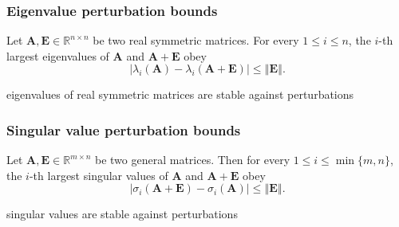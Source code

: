 \documentclass[compress,
mathserif,wide,%
]{beamer}
\begin{document}
\begin{frame}
	\frametitle{Eigenvalue perturbation bounds}
	\begin{lemma}
\label{lemma:weyl}
Let $\bm{A},\bm{E}\in\mathbb{R}^{n\times n}$ be two real symmetric matrices.
	For every $1\leq i\leq n$, the $i$-th largest eigenvalues of $\bm{A}$ and $\bm{A}+\bm{E}$ obey
%
\begin{equation*}
	\left|\lambda_{i}\left(\bm{A}\right)-\lambda_{i}\left(\bm{A} +\bm{E}\right)\right|\leq\left\Vert \bm{E}\right\Vert .
\end{equation*}
%
\end{lemma}

\pause
\vfill
{

\begin{varblock}[\textwidth]{}
\centering
eigenvalues of real symmetric matrices are stable against perturbations
\end{varblock}
}



\end{frame}

\begin{frame}
	\frametitle{Singular value perturbation bounds}
	\begin{lemma}
\label{lemma:weyls-singular-value}
Let $\bm{A},\bm{E}\in\mathbb{R}^{m\times n}$ be two general matrices.
Then for every $1\leq i\leq \min\{m,n\}$, the $i$-th largest singular values of $\bm{A}$ and $\bm{A}+\bm{E}$ obey 
%
\[
	\left|\sigma_{i}\left(\bm{A}+\bm{E}\right)-\sigma_{i}\left(\bm{A}\right)\right|\leq\left\Vert \bm{E}\right\Vert .
\]
%
\end{lemma}

\vfill
{

\begin{varblock}[\textwidth]{}
\centering
singular values are stable against perturbations
\end{varblock}
}
\end{frame}
\end{document}
